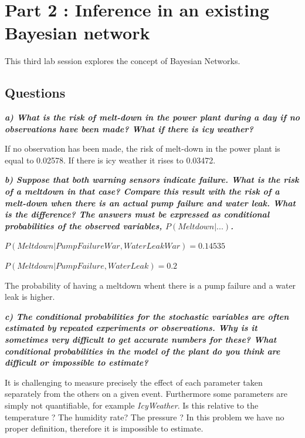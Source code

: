   \section*{Part 2 : Inference in an existing Bayesian network}
 \thispagestyle{empty}

This third lab session explores the concept of Bayesian Networks.

\subsection*{Questions}


\textit{\textbf{a) What is the risk of melt-down in the power plant during a day
if no
observations have been made? What if there is icy weather?}}

\vspace{1em}

If no observation has been made, the risk of melt-down in the power plant is
equal to 0.02578. If there is icy weather it rises to 0.03472.

\textit{\textbf{b) Suppose that both warning sensors indicate failure. What is
the risk
of a meltdown in that case? Compare this result with the risk of a melt-down
when there is an actual pump failure and water leak. What is the difference?
The answers must be expressed as conditional probabilities of the observed
variables, $P(Meltdown|...)$.}}

\vspace{1em}

$P(Meltdown| PumpFailureWar,WaterLeakWar) = 0.14535$

$P(Meltdown| PumpFailure,WaterLeak) = 0.2$

The probability of having a meltdown whent there is a pump failure and a water
leak is higher.

\textit{\textbf{c) The conditional probabilities for the stochastic variables
are often
estimated by repeated experiments or observations. Why is it sometimes very
difficult to get accurate numbers for these? What conditional probabilities
in the model of the plant do you think are difficult or impossible to
estimate?}}

\vspace{1em}


It is challenging to measure precisely the effect of each parameter taken
separately
from the others on a given event. Furthermore some parameters are simply not
quantifiable, for example \textit{IcyWeather}. Is this relative to the
temperature ?
The humidity rate? The pressure ? In this problem we have no proper definition,
therefore it is impossible to estimate.

